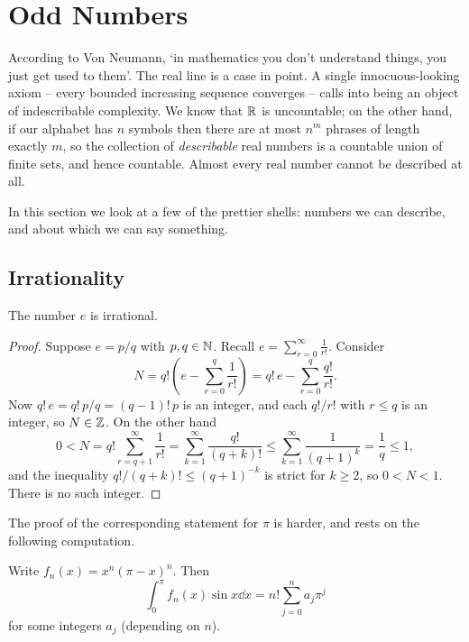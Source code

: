 \documentclass[a4paper]{scrartcl}
\begin{document}
\section{Odd Numbers}

According to Von Neumann, `in mathematics you don't understand things, you just get used to them'. The real line is a case in point. A single innocuous-looking axiom -- every bounded increasing sequence converges -- calls into being an object of indescribable complexity. We know that $\mathbb{R}$ is uncountable; on the other hand, if our alphabet has $n$ symbols then there are at most $n^m$ phrases of length exactly $m$, so the collection of \emph{describable} real numbers is a countable union of finite sets, and hence countable. Almost every real number cannot be described at all.

In this section we look at a few of the prettier shells: numbers we can describe, and about which we can say something.

\subsection{Irrationality}

\begin{theorem}\label{thm:e-irrational}
	The number $e$ is irrational.
\end{theorem}

\begin{proof}
	Suppose $e = p/q$ with $p,q\in\mathbb{N}$. Recall $e = \sum_{r=0}^\infty\frac{1}{r!}$. Consider
	$$N = q!\left(e - \sum_{r=0}^q\frac{1}{r!}\right) = q!\,e - \sum_{r=0}^q\frac{q!}{r!}.$$
	Now $q!\,e = q!\,p/q = (q-1)!\,p$ is an integer, and each $q!/r!$ with $r\leq q$ is an integer, so $N \in\mathbb{Z}$. On the other hand
	$$0 < N = q!\sum_{r=q+1}^\infty\frac{1}{r!} = \sum_{k=1}^\infty\frac{q!}{(q+k)!} \leq \sum_{k=1}^\infty\frac{1}{(q+1)^k} = \frac{1}{q}\leq 1,$$
	and the inequality $q!/(q+k)! \leq (q+1)^{-k}$ is strict for $k\geq2$, so $0<N<1$. There is no such integer.
\end{proof}

The proof of the corresponding statement for $\pi$ is harder, and rests on the following computation.

\begin{lemma}\label{lem:pi-integral}
	Write $f_n(x) = x^n(\pi-x)^n$. Then
	$$\int_0^\pi f_n(x)\sin x\dd x = n!\sum_{j=0}^n a_j\pi^j$$
	for some integers $a_j$ (depending on $n$).
\end{lemma}
\end{document}
